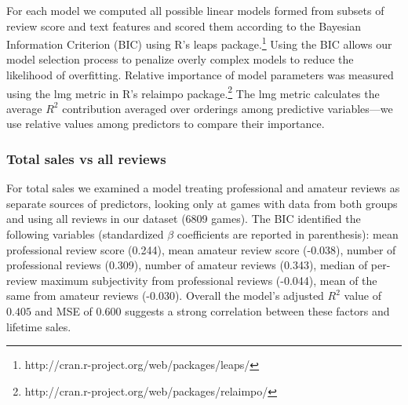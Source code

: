 \documentclass[letterpaper]{article}
\begin{document}
For each model we computed all possible linear models formed from subsets of review score and text features and scored them according to the Bayesian Information Criterion (BIC) using R's leaps package.\footnote{http://cran.r-project.org/web/packages/leaps/} Using the BIC allows our model selection process to penalize overly complex models to reduce the likelihood of overfitting. Relative importance of model parameters was measured using the lmg metric in R's relaimpo package.\footnote{http://cran.r-project.org/web/packages/relaimpo/} The lmg metric calculates the average $R^2$ contribution averaged over orderings among predictive variables---we use relative values among predictors to compare their importance.


\subsubsection{Total sales vs all reviews}
For total sales we examined a model treating professional and amateur reviews as separate sources of predictors, looking only at games with data from both groups and using all reviews in our dataset (6809 games). The BIC identified the following variables (standardized $\beta$ coefficients are reported in parenthesis): mean professional review score (0.244), mean amateur review score (-0.038), number of professional reviews (0.309), number of amateur reviews (0.343), median of per-review maximum subjectivity from professional reviews (-0.044), mean of the same from amateur reviews (-0.030). Overall the model's adjusted $R^2$ value of $0.405$ and MSE of $0.600$ suggests a strong correlation between these factors and lifetime sales.
\end{document}
